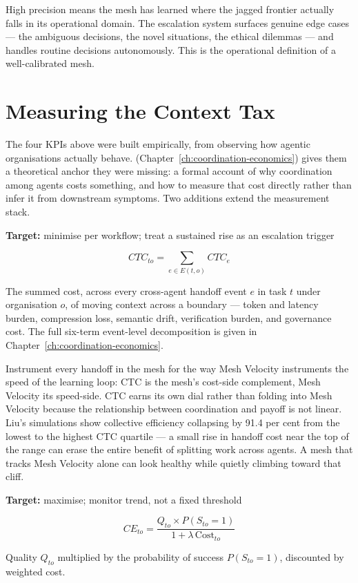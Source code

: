 High precision means the mesh has learned where the jagged frontier actually falls in its operational domain. The escalation system surfaces genuine edge cases --- the ambiguous decisions, the novel situations, the ethical dilemmas --- and handles routine decisions autonomously. This is the operational definition of a well-calibrated mesh.

\section{Measuring the Context Tax}

The four KPIs above were built empirically, from observing how agentic organisations actually behave. \textcite{Liu2026} (Chapter~\ref{ch:coordination-economics}) gives them a theoretical anchor they were missing: a formal account of why coordination among agents costs something, and how to measure that cost directly rather than infer it from downstream symptoms. Two additions extend the measurement stack.

\begin{definitionbox}[title={Contextual Transaction Cost (CTC)}]
\textbf{Target:} minimise per workflow; treat a sustained rise as an escalation trigger

\[
CTC_{to} = \sum_{e \in E(t,o)} CTC_e
\]

The summed cost, across every cross-agent handoff event $e$ in task $t$ under organisation $o$, of moving context across a boundary --- token and latency burden, compression loss, semantic drift, verification burden, and governance cost. The full six-term event-level decomposition is given in Chapter~\ref{ch:coordination-economics}.
\end{definitionbox}

Instrument every handoff in the mesh for  the way Mesh Velocity instruments the speed of the learning loop: CTC is the mesh's cost-side complement, Mesh Velocity its speed-side. CTC earns its own dial rather than folding into Mesh Velocity because the relationship between coordination and payoff is not linear. Liu's simulations show collective efficiency collapsing by 91.4 per cent from the lowest to the highest CTC quartile --- a small rise in handoff cost near the top of the range can erase the entire benefit of splitting work across agents. A mesh that tracks Mesh Velocity alone can look healthy while quietly climbing toward that cliff.

\begin{definitionbox}[title={Collective Efficiency (CE)}]
\textbf{Target:} maximise; monitor trend, not a fixed threshold

\[
CE_{to} = \frac{Q_{to} \times P(S_{to}=1)}{1 + \lambda\,\mathrm{Cost}_{to}}
\]

Quality $Q_{to}$ multiplied by the probability of success $P(S_{to}=1)$, discounted by weighted cost.
\end{definitionbox}

